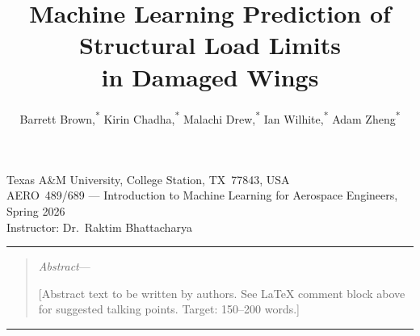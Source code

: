 \documentclass[10pt,letterpaper]{article}
\title{Machine Learning Prediction of Structural Load Limits\\in Damaged Wings}
\author{%
  Barrett Brown,\textsuperscript{*}
  Kirin Chadha,\textsuperscript{*}
  Malachi Drew,\textsuperscript{*}
  Ian Wilhite,\textsuperscript{*}
  Adam Zheng\textsuperscript{*}%
}
\date{}
\makeatletter
\renewcommand{\maketitle}{%
  \begin{center}
    {\large\bfseries \@title \par}
    \vspace{10pt}
    {\normalsize \@author \par}
    \vspace{2pt}
    {\normalsize
      Texas A\&M University, College Station, TX~77843, USA\\[2pt]
      AERO~489/689 --- Introduction to Machine Learning for Aerospace Engineers,
      Spring 2026\\
      Instructor: Dr.~Raktim Bhattacharya}
  \end{center}
  \vspace{8pt}
}
\newenvironment{aiaaabstract}{%
  \noindent\rule{\textwidth}{0.4pt}
  \vspace{2pt}
  \begin{quote}\noindent
  \textit{Abstract}---\ignorespaces
}{%
  \end{quote}
  \noindent\rule{\textwidth}{0.4pt}
  \vspace{6pt}
}
\makeatother
\begin{document}
\maketitle

\begin{aiaaabstract}
  [Abstract text to be written by authors. See \LaTeX{} comment block above for suggested
  talking points. Target: 150--200 words.]
\end{aiaaabstract}

\end{document}
